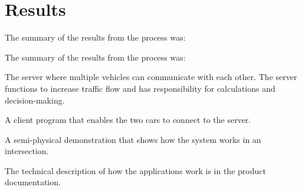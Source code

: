 \section{Results}

The summary of the results from the process was:

The summary of the results from the process was:

The server where multiple vehicles can communicate with each other. The server functions to increase traffic flow and has responsibility for calculations and decision-making. 

A client program that enables the two cars to connect to the server. 

A semi-physical demonstration that shows how the system works in an intersection.

The technical description of how the applications work is in the product documentation. 




